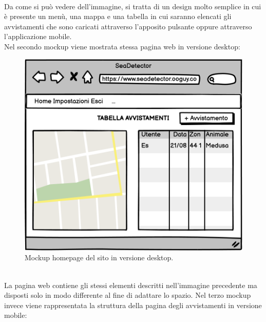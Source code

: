 \documentclass[a4paper,final,12pt]{report}
\begin{document}
\\Da come si può vedere dell'immagine, si tratta di un design molto semplice in cui è presente un menù, una mappa e una tabella in cui saranno elencati gli avvistamenti che sono caricati attraverso l'apposito pulsante oppure attraverso l'applicazione mobile.\\
Nel secondo mockup viene mostrata stessa pagina web in versione desktop: 
\begin{figure}[hbtp]
\centering
\includegraphics[scale=0.90]{img_concettuale/Home.png}
\caption{Mockup homepage del sito in versione desktop.}
\end{figure}
\\La pagina web contiene gli stessi elementi descritti nell'immagine precedente ma disposti solo in modo differente al fine di adattare lo spazio.
Nel terzo mockup invece viene rappresentata la struttura della pagina degli avvistamenti in versione mobile:
\end{document}
